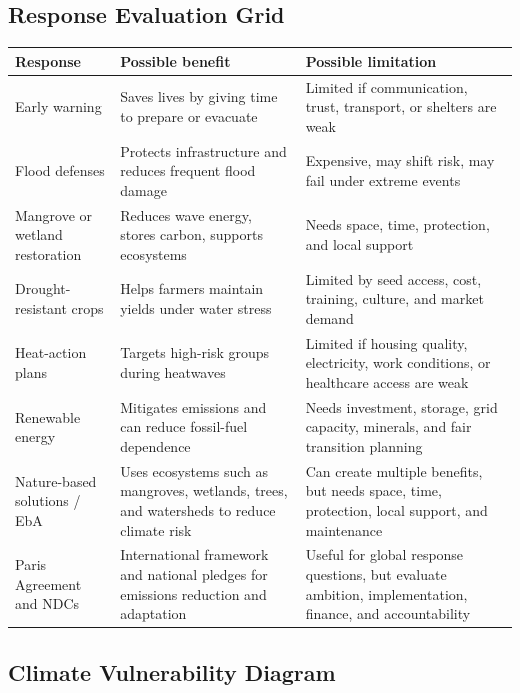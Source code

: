 \documentclass[11pt,a4paper]{article}
\begin{document}
\subsection{Response Evaluation Grid}

\begin{tabularx}{\textwidth}{L{0.19\textwidth}Y Y}
\toprule
\textbf{Response} & \textbf{Possible benefit} & \textbf{Possible limitation} \\
\midrule
Early warning & Saves lives by giving time to prepare or evacuate & Limited if
communication, trust, transport, or shelters are weak \\
Flood defenses & Protects infrastructure and reduces frequent flood damage &
Expensive, may shift risk, may fail under extreme events \\
Mangrove or wetland restoration & Reduces wave energy, stores carbon, supports
ecosystems & Needs space, time, protection, and local support \\
Drought-resistant crops & Helps farmers maintain yields under water stress &
Limited by seed access, cost, training, culture, and market demand \\
Heat-action plans & Targets high-risk groups during heatwaves & Limited if
housing quality, electricity, work conditions, or healthcare access are weak \\
Renewable energy & Mitigates emissions and can reduce fossil-fuel dependence &
Needs investment, storage, grid capacity, minerals, and fair transition planning \\
Nature-based solutions / EbA & Uses ecosystems such as mangroves, wetlands,
trees, and watersheds to reduce climate risk & Can create multiple benefits,
but needs space, time, protection, local support, and maintenance \\
Paris Agreement and NDCs & International framework and national pledges for
emissions reduction and adaptation & Useful for global response questions, but
evaluate ambition, implementation, finance, and accountability \\
\bottomrule
\end{tabularx}

\subsection{Climate Vulnerability Diagram}
\end{document}
